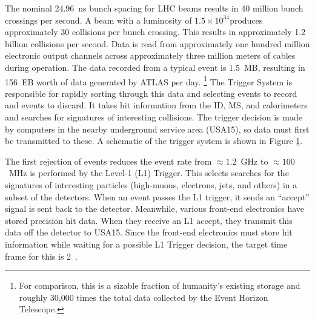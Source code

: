 \begin{figure}[h!]
\captionsetup[subfigure]{position=b}
\centering
{}
\caption{}
\label{fig:atlasTrigger}
\end{figure}

The nominal 24.96~ns bunch spacing for LHC beams results in 40 million bunch crossings per second.
A beam with a luminosity of $1.5\times10^{34}$\cms produces approximately 30 collisions per bunch crossing.
This results in approximately 1.2 billion collisions per second.
Data is read from approximately one hundred million electronic output channels across approximately three million meters of cables during operation. \cite{atlasFacts}
The data recorded from a typical event is 1.5~MB, resulting in 156~EB worth of data generated by ATLAS per day.
\footnote{For comparison, this is a sizable fraction of humanity's existing storage and roughly 30,000 times the total data collected by the Event Horizon Telescope.}
The Trigger System is responsible for rapidly sorting through this data and selecting events to record and events to discard.
It takes hit information from the ID, MS, and calorimeters and searches for signatures of interesting collisions.
The trigger decision is made by computers in the nearby underground service area (USA15), so data must first be transmitted to these.
A schematic of the trigger system is shown in Figure \ref{fig:atlasTrigger}.

The first rejection of events reduces the event rate from $\approx1.2$~GHz to $\approx100$~MHz is performed by the Level-1 (L1) Trigger.
This selects searches for the signatures of interesting particles (high-\pt muons, electrons, jets, and others) in a subset of the detectors.
When an event passes the L1 trigger, it sends an ``accept'' signal is sent back to the detector.
Meanwhile, various front-end electronics have stored precision hit data.
When they receive an L1 accept, they transmit this data off the detector to USA15.
Since the front-end electronics must store hit information while waiting for a possible L1 Trigger decision, the target time frame for this is 2~\us.
\cite{triggerTdr}

